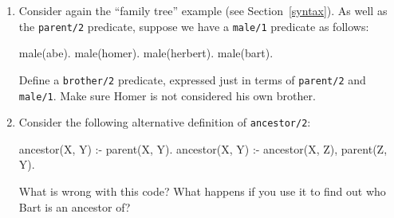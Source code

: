 \begin{enumerate}

\item

Consider again the ``family tree'' example (see Section~\ref{syntax}).
As well as the \texttt{parent/2} predicate, suppose we have a
\texttt{male/1} predicate as follows:

\begin{code}
male(abe).
male(homer).
male(herbert).
male(bart).
\end{code}

Define a \texttt{brother/2} predicate, expressed just in terms of
\texttt{parent/2} and \texttt{male/1}.  Make sure Homer is not considered
his own brother.


\item

Consider the following alternative definition of \texttt{ancestor/2}:

\begin{code}
ancestor(X, Y) :- parent(X, Y).
ancestor(X, Y) :- ancestor(X, Z), parent(Z, Y).
\end{code}

What is wrong with this code?  What happens if you use it to find out
who Bart is an ancestor of?

\end{enumerate}

